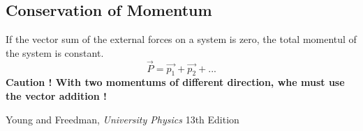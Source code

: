 \documentclass[a4paper,10pt]{article}
\begin{document}
\subsection{Conservation of Momentum}
If the vector sum of the external forces on a system is zero, the total momentul of the system is constant.
\[\vec{P} = \vec{p_1} + \vec{p_2} + ...\]
{ \bf Caution ! With two momentums of different direction, whe must use the vector addition !}

\begin{thebibliography}{9}

	Young and Freedman,
	\emph{University Physics}
	13th Edition

\end{thebibliography}
\end{document}

